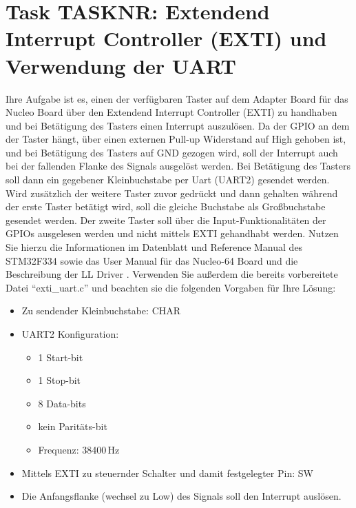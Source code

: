 \documentclass[a4paper,12pt]{article}
\begin{document}
\pagestyle{empty}
\setlength{\parindent}{0em}
\section*{Task {{TASKNR}}: Extendend Interrupt Controller (EXTI) und Verwendung der UART}

Ihre Aufgabe ist es, einen der verfügbaren Taster auf dem Adapter Board für das Nucleo Board über den Extendend Interrupt Controller (EXTI) zu handhaben und bei Betätigung des Tasters einen Interrupt auszulösen. Da der GPIO an dem der Taster hängt, über einen externen Pull-up Widerstand auf High gehoben ist, und bei Betätigung des Tasters auf GND gezogen wird, soll der Interrupt auch bei der fallenden Flanke des Signals ausgelöst werden. Bei Betätigung des Tasters soll dann ein gegebener Kleinbuchstabe per Uart (UART2) gesendet werden. Wird zusätzlich der weitere Taster zuvor gedrückt und dann gehalten während der erste Taster betätigt wird, soll die gleiche Buchstabe als Großbuchstabe gesendet werden. Der zweite Taster soll über die Input-Funktionalitäten der GPIOs ausgelesen werden und nicht mittels EXTI gehandhabt werden. Nutzen Sie hierzu die Informationen im Datenblatt \cite{data_sheet} und Reference Manual \cite{ref_manual} des STM32F334 sowie das User Manual für das Nucleo-64 Board \cite{nucleo_manual} und die Beschreibung der LL Driver \cite{driver_manual}. Verwenden Sie außerdem die bereits vorbereitete Datei \enquote{exti\_uart.c} und beachten sie die folgenden Vorgaben für Ihre Lösung:

\begin{itemize}
\item Zu sendender Kleinbuchstabe: {{CHAR}}
\item UART2 Konfiguration:
\begin{itemize}
    \item 1 Start-bit
    \item 1 Stop-bit
    \item 8 Data-bits
    \item kein Paritäts-bit
    \item Frequenz: 38400\,Hz 
\end{itemize}
\item Mittels EXTI zu steuernder Schalter und damit festgelegter Pin: {{SW}}
\item Die Anfangsflanke (wechsel zu Low) des Signals soll den Interrupt auslösen.
\end{itemize}
\vspace{0.3cm}
\end{document}
